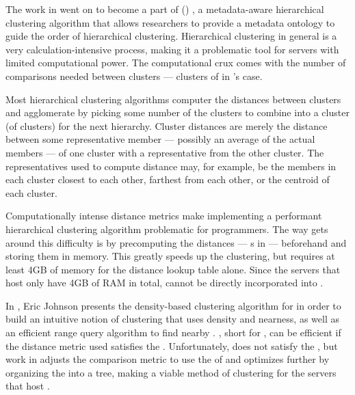 The work in \cite{DBLP:conf/bibm/MontanaDNBK11, montana2012investigating} went on to become a part of \ohclust{} (\ohclustlong{}) \cite{SolimanDVMBNWKG12, montana2013ontological, montana2013algorithms}, a metadata-aware hierarchical clustering algorithm that allows \cplop{} researchers to provide a metadata ontology to guide the order of hierarchical clustering.
Hierarchical clustering in general is a very calculation-intensive process, making it a problematic tool for servers with limited computational power.
The computational crux comes with the number of comparisons needed between clusters --- clusters of \isols{} in \cplop{}'s case.

Most hierarchical clustering algorithms computer the distances between clusters and agglomerate by picking some number of the clusters to combine into a cluster (of clusters) for the next hierarchy.
Cluster distances are merely the distance between some representative member --- possibly an average of the actual members --- of one cluster with a representative from the other cluster.
The representatives used to compute distance may, for example, be the members in each cluster closest to each other, farthest from each other, or the centroid of each cluster.

Computationally intense distance metrics make implementing a performant hierarchical clustering algorithm problematic for programmers.
The way \ohclust{} gets around this difficulty is by precomputing the distances --- \pearson{}s in \cplop{} --- beforehand and storing them in memory.
This greatly speeds up the clustering, but requires at least 4GB of memory for the distance lookup table alone.
Since the servers that host \cplop{} only have 4GB of RAM in total, \ohclust{} cannot be directly incorporated into \cplop{}.

In \cite{johnson2015density}, Eric Johnson presents the density-based clustering algorithm for \pyros{} in order to build an intuitive notion of clustering that uses density and nearness, as well as an efficient range query algorithm to find nearby \isols{}.
\dbscan{} \cite{ester1996density}, short for \dbscanlong{}, can be efficient if the distance metric used satisfies the \trieq{}.
Unfortunately, \pearson{} does not satisfy the \trieq{}, but work in \cite{johnson2015density} adjusts the comparison metric to use the \euclid{} of \zscores{} and optimizes further by organizing the \pyros{} into a tree, making \dbscan{} a viable method of clustering for the servers that host \cplop{}.

